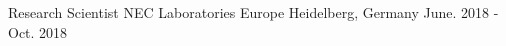 \cventry
{Research Scientist} %
{NEC Laboratories Europe} %
{Heidelberg, Germany} %
{June. 2018 - Oct. 2018} %
{ %
}
